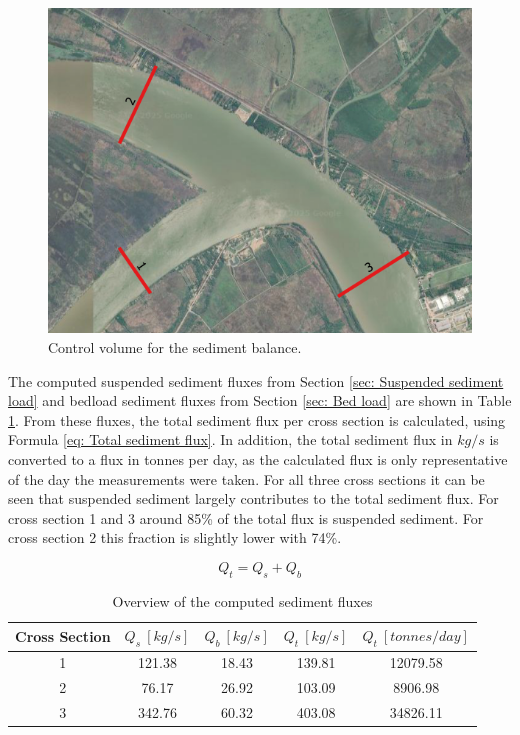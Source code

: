 \begin{figure}[H]
    \centering
    \includegraphics[width=0.75\linewidth]{figures/ch6/Map_sed_balance.png}
    \caption{Control volume for the sediment balance.}
    \label{fig:Area sediment balance}
\end{figure}

The computed suspended sediment fluxes from Section \ref{sec: Suspended sediment load} and bedload sediment fluxes from Section \ref{sec: Bed load} are shown in Table \ref{tab: Overview sediment fluxes}. From these fluxes, the total sediment flux per cross section is calculated, using Formula \ref{eq: Total sediment flux}. In addition, the total sediment flux in $kg/s$ is converted to a flux in tonnes per day, as the calculated flux is only representative of the day the measurements were taken. For all three cross sections it can be seen that suspended sediment largely contributes to the total sediment flux. For cross section 1 and 3 around 85\% of the total flux is suspended sediment. For cross section 2 this fraction is slightly lower with 74\%. 

\begin{equation}
    Q_t = Q_s + Q_b
    \label{eq: Total sediment flux}
\end{equation}

\begin{table}[H]
    \centering
    \caption{Overview of the computed sediment fluxes}
    \label{tab: Overview sediment fluxes}
    \setlength{\tabcolsep}{8pt}
    \begin{tabular}{c c c c c}
        \hline
        Cross Section & $Q_s~[kg/s]$ & $Q_b~[kg/s]$ & $Q_t~[kg/s]$ &  $Q_t~[tonnes/day]$ \\
        \hline
        1 & 121.38 &  18.43 & 139.81 & 12079.58\\
        2 & 76.17  &  26.92 & 103.09 & 8906.98\\
        3 & 342.76 & 60.32 & 403.08 & 34826.11\\
        \hline
    \end{tabular}
\end{table}

